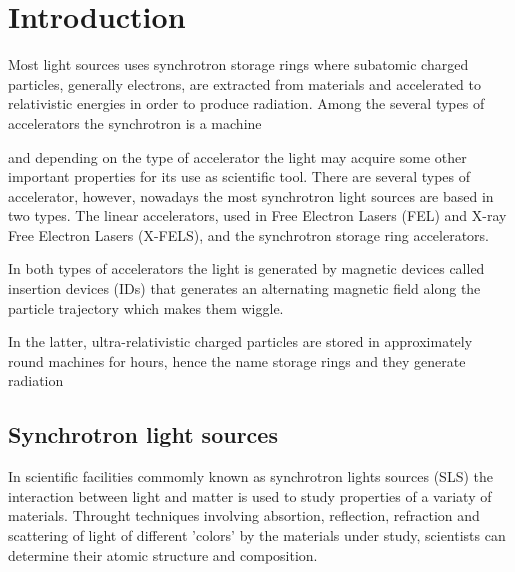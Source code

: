 \documentclass[
	12pt,				%
	openright,			%
	oneside,			%
	a4paper,		%
	chapter=TITLE,		%
	section=TITLE,		%
    brazil,				%
	english,			%
	sumario=tradicional,
	]{abntex2}
\begin{document}
	\frenchspacing

	\pretextual
	

	\textual

%	




\chapter{Introduction} \label{chap:intro}




Most light sources uses synchrotron storage rings where subatomic charged particles, generally electrons, are extracted from materials and accelerated to relativistic energies in order to produce radiation. Among the several types of accelerators the synchrotron is a machine


and depending on the type of accelerator the light may acquire some other important properties for its use as scientific tool. There are several types of accelerator, however, nowadays the most  synchrotron light sources are based in two types. The linear accelerators, used in Free Electron Lasers (FEL) and X-ray Free Electron Lasers (X-FELS), and the synchrotron storage ring accelerators.

In both types of accelerators the light is generated by magnetic devices called insertion devices (IDs) that generates an alternating magnetic field along the particle trajectory which makes them wiggle.


In the latter, ultra-relativistic charged particles are stored in approximately round machines for hours, hence the name storage rings and they generate radiation

  \section{Synchrotron light sources}

  In scientific facilities commomly known as synchrotron lights sources (SLS) the interaction between light and matter is used to study properties of a variaty of materials. Throught techniques involving absortion, reflection, refraction and scattering of light of different 'colors' by the materials under study, scientists can determine their atomic structure and composition.
\end{document}
